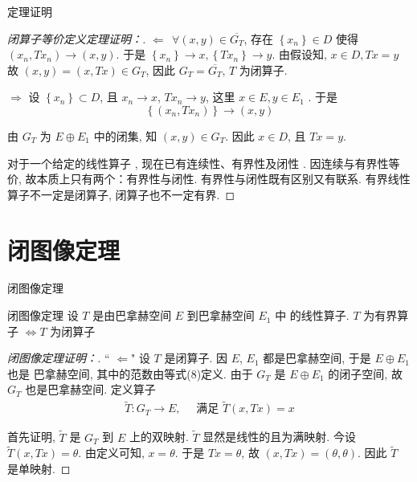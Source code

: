 \documentclass[sans,mathserif]{beamer} %
\begin{document}
\begin{frame}{定理证明}
\begin{proof}[闭算子等价定义定理证明：]
	$\Leftarrow~~\forall(x, y) \in \overline{G_{T}}$,  存在  $\left\{x_{n}\right\} \in D$  使得  $\left(x_{n}, T x_{n}\right) \rightarrow(x, y) $.
于是 $ \left\{x_{n}\right\} \rightarrow x,\left\{T x_{n}\right\} \rightarrow y $.  由假设知, $ x \in D, T x=y $
故 $ (x, y)=(x, T x) \in G_{T}$,  因此 $ G_{T}=\overline{G_{T}}$, $T $ 为闭算子.

$\Rightarrow$  设 $ \left\{x_{n}\right\} \subset D$,  且  $x_{n} \rightarrow x$, $T x_{n} \rightarrow y$,  这里 $ x \in E, y \in E_{1}$ .  于是
\begin{equation*}
	\left\{\left(x_{n}, T x_{n}\right)\right\} \rightarrow(x, y)
\end{equation*}

由 $ G_{T} $ 为 $ E \oplus E_{1} $ 中的闭集, 知 $ (x, y) \in G_{T} $. 因此 $ x \in D$,  且 $ T x=y $.

对于一个给定的线性算子 , 现在已有连续性、有界性及闭性 . 因连续与有界性等价, 故本质上只有两个：有界性与闭性. 有界性与闭性既有区别又有联系. 有界线性算子不一定是闭算子, 闭算子也不一定有界.
\end{proof}
\end{frame}

\section{闭图像定理}
\begin{frame}{闭图像定理}
	\begin{theorem}{闭图像定理}
		设 $ T $ 是由巴拿赫空间 $ E $ 到巴拿赫空间 $ E_{1} $ 中 的线性算子.
		$T$  为有界算子 $ \Longleftrightarrow T $ 为闭算子
	\end{theorem}

	\begin{proof}[闭图像定理证明：]
		`` $\Leftarrow $"  设 $ T $ 是闭算子. 因 $ E$, $E_{1}$  都是巴拿赫空间, 于是 $ E \oplus E_{1} $ 也是
巴拿赫空间, 其中的范数由等式(8)定义.
由于 $ G_{T} $ 是 $ E \oplus E_{1} $ 的闭子空间, 故 $ G_{T} $ 也是巴拿赫空间.
定义算子
\begin{align*}
	\widetilde{T}: G_{T} \rightarrow E, \quad \text { 满足 } \widetilde{T}(x, T x)=x
\end{align*}

首先证明, $ \widetilde{T} $ 是 $ G_{T} $ 到 $ E $ 上的双映射. $ \widetilde{T} $ 显然是线性的且为满映射.
今设 $ \widetilde{T}(x, T x)=\theta $.  由定义可知,  $x=\theta $.  于是 $ T x=\theta$,  故 $ (x, T x)=(\theta, \theta) $.
因此 $ \tilde{T} $ 是单映射.
	\end{proof}
	\end{frame}
\end{document}
